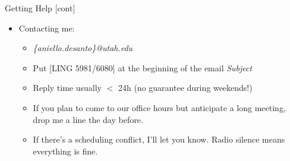 \documentclass[professionalfonts, xcolor={usenames,svgnames,x11names,table}]{beamer}
\begin{document}
 \begin{frame}{Getting Help [cont]}      
   \begin{itemize}      
        \item Contacting me:
            \begin{itemize}
                \item \textit{\{aniello.desanto\}@utah.edu}
                \item Put [LING 5981/6080] at the beginning of the email \textit{Subject}
                \item Reply time usually $<$ 24h (no guarantee during weekends!)
                \item If you plan to come to our office hours but anticipate a long meeting, drop me a line 
                    the day before.
                     \item  If there's a scheduling conflict, I'll let you know.
                    Radio silence means everything is fine.
            \end{itemize}
    \end{itemize}
\end{frame}



\end{document}
